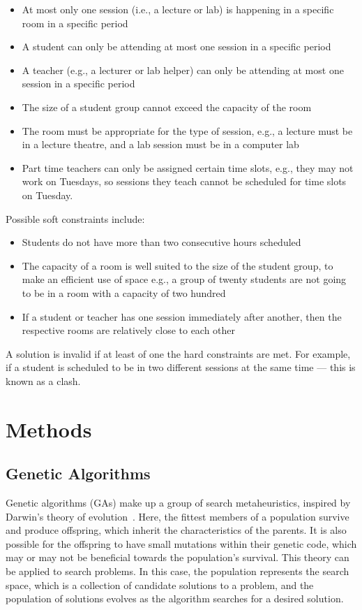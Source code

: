 \documentclass[a4paper, 12pt]{report}
\begin{document}
\begin{itemize}
	\item At most only one session (i.e., a lecture or lab) is happening in a 
		specific room in a specific period
	\item A student can only be attending at most one session in a specific 
		period
	\item A teacher (e.g., a lecturer or lab helper) can only be attending at 
		most one session in a specific period
	\item The size of a student group cannot exceed the capacity of the room
	\item The room must be appropriate for the type of session, e.g., a lecture 
		must be in a lecture theatre, and a lab session must be in a computer 
		lab
	\item Part time teachers can only be assigned certain time slots, e.g., they
		may not work on Tuesdays, so sessions they teach cannot be scheduled
		for time slots on Tuesday.
\end{itemize}

Possible soft constraints include:

\begin{itemize}
	\item Students do not have more than two consecutive hours scheduled
	\item The capacity of a room is well suited to the size of the student
		group, to make an efficient use of space e.g., a group of twenty
		students are not going to be in a room with a capacity of two hundred
	\item If a student or teacher has one session immediately after another,
		then the respective rooms are relatively close to each other
\end{itemize}

A solution is invalid if at least of one the hard constraints are met.
For example, if a student is scheduled to be in two different sessions at the
same time --- this is known as a clash.

\section{Methods}

\subsection{Genetic Algorithms}

Genetic algorithms (GAs) make up a group of search metaheuristics, inspired by
Darwin's theory of evolution~\cite{ga_book}.
Here, the fittest members of a population survive and produce offspring, which
inherit the characteristics of the parents.
It is also possible for the offspring to have small mutations within their
genetic code, which may or may not be beneficial towards the population's
survival.
This theory can be applied to search problems.
In this case, the population represents the search space, which is a collection 
of candidate solutions to a problem, and the population of solutions evolves as
the algorithm searches for a desired solution.
\end{document}
